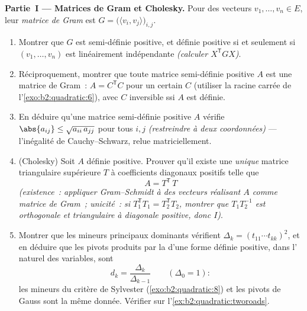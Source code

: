 \begin{problem}
\medskip
\noindent\textbf{Partie~I --- Matrices de Gram et Cholesky.} Pour
des vecteurs $v_1, \dots, v_n \in E$, leur \emph{matrice de Gram}
est $G = \bigl(\langle v_i, v_j\rangle\bigr)_{i,j}$.
\begin{enumerate}
  \item Montrer que $G$ est  semi-définie positive, et
        définie positive si et seulement si $(v_1, \dots, v_n)$ est
        linéairement indépendante \emph{(calculer $X^{\mathsf T}GX$)}.
  \item Réciproquement, montrer que toute matrice 
        semi-définie positive $A$ est une matrice de Gram~: $A =
        C^{\mathsf T}C$ pour un certain $C$ (utiliser la racine
        carrée de l'\cref{exo:b2:quadratic:6}), avec $C$ inversible
        ssi $A$ est définie.
  \item En déduire qu'une matrice semi-définie positive $A$ vérifie
        $\abs{a_{ij}} \leq \sqrt{a_{ii}\,a_{jj}}$ pour tous $i,
        j$ \emph{(restreindre à deux coordonnées)} --- l'inégalité
        de Cauchy--Schwarz, relue matriciellement.
  \item (Cholesky) Soit $A$ définie positive. Prouver qu'il existe
        une \emph{unique} matrice triangulaire supérieure $T$ à
        coefficients diagonaux positifs telle que
        \[
        A = T^{\mathsf T}\,T
        \]
        \emph{(existence~: appliquer Gram--Schmidt à des vecteurs
        réalisant $A$ comme matrice de Gram~; unicité~: si
        $T_1^{\mathsf T}T_1 = T_2^{\mathsf T}T_2$, montrer que
        $T_1T_2^{-1}$ est orthogonale et triangulaire à diagonale
        positive, donc $I$)}.
  \item Montrer que les mineurs principaux dominants vérifient
        $\Delta_k = (t_{11}\cdots t_{kk})^2$, et en déduire que
        les pivots produits par la  d'une forme
        définie positive, dans l' naturel des variables, sont
        \[
        d_k = \frac{\Delta_k}{\Delta_{k-1}}
        \qquad (\Delta_0 = 1) :
        \]
        les mineurs du critère de Sylvester
        (\cref{exo:b2:quadratic:8}) et les pivots de Gauss sont
        la même donnée. Vérifier sur
        l'\cref{ex:b2:quadratic:tworoads}.
\end{enumerate}


\end{problem}
